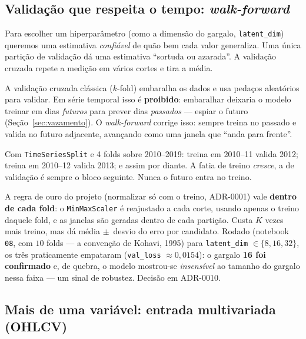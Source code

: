\subsection{Validação que respeita o tempo: \emph{walk-forward}}
\label{sec:fase2-walkforward}

Para escolher um hiperparâmetro (como a dimensão do gargalo, \texttt{latent\_dim}) queremos uma
estimativa \emph{confiável} de quão bem cada valor generaliza. Uma única partição de validação dá
uma estimativa ``sortuda ou azarada''. A validação cruzada repete a medição em vários cortes e
tira a média.

\begin{intuicao}
A validação cruzada clássica ($k$-fold) embaralha os dados e usa pedaços aleatórios para validar.
Em série temporal isso é \textbf{proibido}: embaralhar deixaria o modelo treinar em dias
\emph{futuros} para prever dias \emph{passados} --- espiar o futuro (Seção~\ref{sec:vazamento}).
O \emph{walk-forward} corrige isso: sempre treina no passado e valida no futuro adjacente,
avançando como uma janela que ``anda para frente''.
\end{intuicao}

\begin{exemplo}
Com \texttt{TimeSeriesSplit} e 4 folds sobre 2010--2019: treina em 2010--11 valida 2012; treina
em 2010--12 valida 2013; e assim por diante. A fatia de treino \emph{cresce}, a de validação é
sempre o bloco seguinte. Nunca o futuro entra no treino.
\end{exemplo}

\begin{naprat}
A regra de ouro do projeto (normalizar só com o treino, ADR-0001) vale \textbf{dentro de cada
fold}: o \texttt{MinMaxScaler} é reajustado a cada corte, usando apenas o treino daquele fold, e
as janelas são geradas dentro de cada partição. Custa $K$ vezes mais treino, mas dá média
$\pm$~desvio do erro por candidato. Rodado (notebook \texttt{08}, com $10$ folds --- a convenção
de Kohavi, 1995) para \texttt{latent\_dim} $\in \{8,16,32\}$, os três praticamente empataram
(\texttt{val\_loss} $\approx 0{,}0154$): o gargalo \textbf{16 foi confirmado} e, de quebra, o
modelo mostrou-se \emph{insensível} ao tamanho do gargalo nessa faixa --- um sinal de robustez.
Decisão em ADR-0010.
\end{naprat}

\subsection{Mais de uma variável: entrada multivariada (OHLCV)}
\label{sec:fase2-multivariado}

